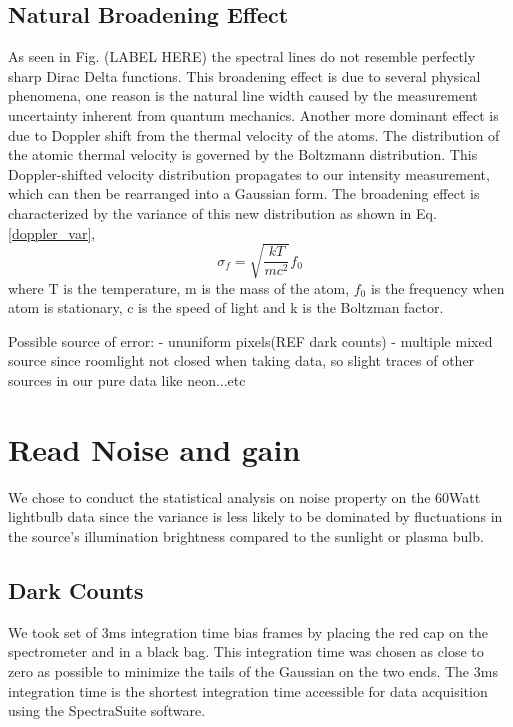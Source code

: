 \documentclass[authoryear, 12pt,5p, times]{elsarticle}
\begin{document}
	 \subsection{Natural Broadening Effect}
 As seen in Fig. (LABEL HERE) the spectral lines do not resemble perfectly sharp Dirac Delta functions. This broadening effect is due to several physical phenomena, one reason is the natural line width caused by the measurement uncertainty inherent from quantum mechanics. Another more dominant effect is due to Doppler shift from the thermal velocity of the atoms. The distribution of the atomic thermal velocity is governed by the Boltzmann distribution. This Doppler-shifted velocity distribution propagates to our intensity measurement, which can then be rearranged into a Gaussian form. The broadening effect is characterized by the variance of this new distribution as shown in  Eq. \ref{doppler_var},
 \begin{equation}\label{doppler_var}
\sigma_f = \sqrt{\frac{kT}{mc^2}}f_0
 \end{equation}
 where T is the temperature, m is the mass of the atom, $f_0$ is the frequency when atom is stationary, c is the speed of light and k is the Boltzman factor.
 

Possible source of error: 
- ununiform pixels(REF dark counts)
- multiple mixed source since roomlight not closed when taking data, so slight traces of other sources in our pure data like neon...etc
\section{Read Noise and gain}
We chose to conduct the statistical analysis on noise property on the 60Watt lightbulb data since the variance is less likely to be dominated by fluctuations in the source's illumination brightness compared to the sunlight or plasma bulb.
 \subsection{Dark Counts}
 We took set of 3ms integration time bias frames by placing the red cap on the spectrometer and in a black bag. This integration time was chosen as close to zero as possible to minimize the tails of the Gaussian on the two ends. The 3ms integration time is the shortest integration time accessible for data acquisition using the SpectraSuite software. 
 
\end{document}

